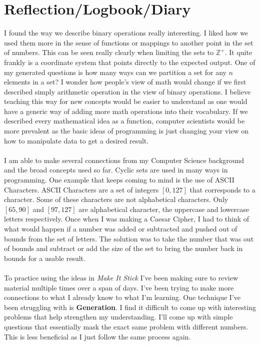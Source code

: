 \documentclass[11pt]{article}
\theoremstyle{plain}
\theoremstyle{definition}
\newcommand{\Zplus}{\mathbb{Z^+}}
\begin{document}
\section{Reflection/Logbook/Diary}
I found the way we describe binary operations really interesting. I liked how we used them more in the sense of functions or mappings to another point in the set of numbers. This can be seen really clearly when limiting the sets to $\Zplus$. It quite frankly is a coordinate system that points directly to the expected output. One of my generated questions is how many ways can we partition a set for any $n$ elements in a set? I wonder how people's view of math would change if we first described simply arithmetic operation in the view of binary operations. I believe teaching this way for new concepts would be easier to understand as one would have a generic way of adding more math operations into their vocabulary. If we described every mathematical idea as a function, computer scientists would be more prevalent as the basic ideas of programming is just changing your view on how to manipulate data to get a desired result.\\
\\
I am able to make several connections from my Computer Science background and the broad concepts used so far. Cyclic sets are used in many ways in programming. One example that keeps coming to mind is the use of ASCII Characters. ASCII Characters are a set of integers $[0,127]$ that corresponds to a character. Some of these characters are not alphabetical characters. Only $[65,90]$ and $[97,127]$ are alphabetical character, the uppercase and lowercase letters respectively. Once when I was making a Caesar Cipher, I had to think of what would happen if a number was added or subtracted and pushed out of bounds from the set of letters. The solution was to take the number that was out of bounds and subtract or add the size of the set to bring the number back in bounds for a usable result. \\
\\
To practice using the ideas in \textit{Make It Stick} I've been making sure to review material multiple times over a span of days. I've been trying to make more connections to what I already know to what I'm learning. One technique I've been struggling with is \textbf{Generation}. I find it difficult to come up with interesting problems that help strengthen my understanding. I'll come up with simple questions that essentially mask the exact same problem with different numbers. This is less beneficial as I just follow the same process again.
\end{document}
